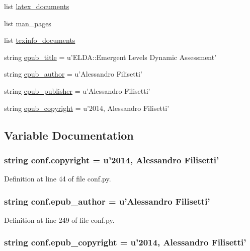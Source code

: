 \begin{DoxyCompactItemize}
\item 
list \hyperlink{a00134_a7812f49970f3de0d15dd7b9b9a10e3a1}{latex\+\_\+documents}
\item 
list \hyperlink{a00134_a85efc5fee48a26fa2d651f6eeb38fc2b}{man\+\_\+pages}
\item 
list \hyperlink{a00134_a54b0faed214ac92017d5689efbb10672}{texinfo\+\_\+documents}
\item 
string \hyperlink{a00134_a9e0d62d22b83ce34deb3f16ba63cedfe}{epub\+\_\+title} = u'E\+L\+D\+A\+::\+Emergent Levels Dynamic Assessment'
\item 
string \hyperlink{a00134_a986ebf7aa037c6bf39add300ab98a611}{epub\+\_\+author} = u'Alessandro Filisetti'
\item 
string \hyperlink{a00134_a13c40319d84c9383e0d119773cc1ed02}{epub\+\_\+publisher} = u'Alessandro Filisetti'
\item 
string \hyperlink{a00134_a443008520a058a726d07c6b5ccf45366}{epub\+\_\+copyright} = u'2014, Alessandro Filisetti'
\end{DoxyCompactItemize}


\subsection{Variable Documentation}
\hypertarget{a00134_a33fa97cf51dcb25970fbf53f10159589}{
\subsubsection[{copyright}]{\setlength{\rightskip}{0pt plus 5cm}string conf.\+copyright = u'2014, Alessandro Filisetti'}}\label{a00134_a33fa97cf51dcb25970fbf53f10159589}


Definition at line 44 of file conf.\+py.

\hypertarget{a00134_a986ebf7aa037c6bf39add300ab98a611}{
\subsubsection[{epub\+\_\+author}]{\setlength{\rightskip}{0pt plus 5cm}string conf.\+epub\+\_\+author = u'Alessandro Filisetti'}}\label{a00134_a986ebf7aa037c6bf39add300ab98a611}


Definition at line 249 of file conf.\+py.

\hypertarget{a00134_a443008520a058a726d07c6b5ccf45366}{
\subsubsection[{epub\+\_\+copyright}]{\setlength{\rightskip}{0pt plus 5cm}string conf.\+epub\+\_\+copyright = u'2014, Alessandro Filisetti'}}\label{a00134_a443008520a058a726d07c6b5ccf45366}


